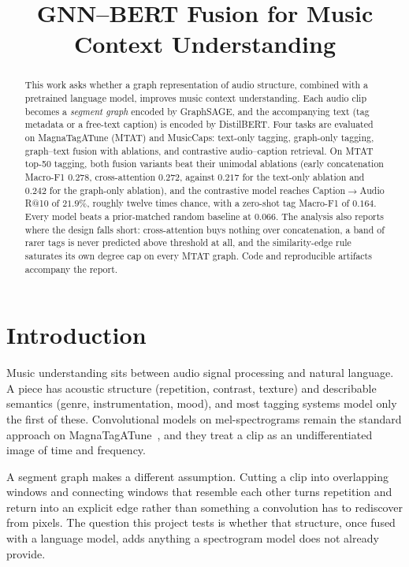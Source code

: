 \documentclass{article}
\title{GNN--BERT Fusion for Music Context Understanding}
\author{}
\begin{document}
\maketitle

\begin{abstract}
This work asks whether a graph representation of audio structure, combined with
a pretrained language model, improves music context understanding. Each audio
clip becomes a \emph{segment graph} encoded by GraphSAGE, and the accompanying
text (tag metadata or a free-text caption) is encoded by DistilBERT. Four tasks
are evaluated on MagnaTagATune (MTAT) and MusicCaps: text-only tagging,
graph-only tagging, graph--text fusion with ablations, and contrastive
audio--caption retrieval. On MTAT top-50 tagging, both fusion variants beat
their unimodal ablations (early concatenation Macro-F1 $0.278$, cross-attention
$0.272$, against $0.217$ for the text-only ablation and $0.242$ for the
graph-only ablation), and the contrastive model reaches
Caption$\rightarrow$Audio R@10 of $21.9\%$, roughly twelve times chance, with a
zero-shot tag Macro-F1 of $0.164$. Every model beats a prior-matched random
baseline at $0.066$. The analysis also reports where the design falls short:
cross-attention buys nothing over concatenation, a band of rarer tags is never
predicted above threshold at all, and the similarity-edge rule saturates its
own degree cap on every MTAT graph. Code and reproducible artifacts accompany
the report.
\end{abstract}

\section{Introduction}
Music understanding sits between audio signal processing and natural language.
A piece has acoustic structure (repetition, contrast, texture) and describable
semantics (genre, instrumentation, mood), and most tagging systems model only
the first of these. Convolutional models on mel-spectrograms remain the
standard approach on MagnaTagATune~\cite{choi2016autotagging,won2020evaluation},
and they treat a clip as an undifferentiated image of time and frequency.

A segment graph makes a different assumption. Cutting a clip into overlapping
windows and connecting windows that resemble each other turns repetition and
return into an explicit edge rather than something a convolution has to
rediscover from pixels. The question this project tests is whether that
structure, once fused with a language model, adds anything a spectrogram model
does not already provide.
\end{document}
